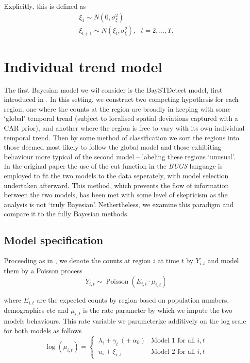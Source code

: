 \documentclass[11pt]{report}
\begin{document}
Explicitly, this is defined as
\begin{gather}
\xi_1 \sim N(0, \sigma_\xi^2) \\
\xi_{t+1} \sim N(\xi_{t}, \sigma_{\xi}^2), \ \ \ t = 2, \ldots, T.
\end{gather}

\chapter{Individual trend model}

The first Bayesian model we wil consider is the BaySTDetect model, first introduced in \citet{baystdetect}. In this setting, we construct two competing hypothesis for each region, one where the counts at the region are broadly in keeping with some `global' temporal trend (subject to localised spatial deviations captured with a CAR prior), and another where the region is free to vary with its own individual temporal trend. Then by some method of classification we sort the regions into those deemed most likely to follow the global model and those exhibiting behaviour more typical of the second model -- labeling these regions `unusual'. \\

In the original paper \citet{baystdetect} the use of the cut function in the \emph{BUGS} language is employed to fit the two models to the data seperately, with model selection undertaken afterward. This method, which prevents the flow of information between the two models, has been met with some level of skepticism \citep{gelmancut} as the analysis is not `truly Bayesian'. Nethertheless, we examine this paradigm and compare it to the fully Bayesian methods. 

\section{Model specification}

Proceeding as in \citet{baystdetect}, we denote the counts at region $i$ at time $t$ by $Y_{i,t}$ and model them by a Poisson process
\begin{equation}
Y_{i,t} \sim \operatorname{Poisson}(E_{i,t} \cdot \mu_{i,t})
\end{equation}

where $E_{i,t}$ are the expected counts by region based on population numbers, demographics etc and $\mu_{i,t}$ is the rate parameter by which we impute the two models behaviours. This rate variable we parameterize additively on the log scale for both models as follows
\begin{equation}
\log{(\mu_{i,t})} = \begin{cases}
\ \lambda_{i} + \gamma_{t} \  (+ \  \alpha_0) & \textrm{Model 1 for all } i, t \\
\ u_{i} + \xi_{i,t} & \textrm{Model 2 for all } i, t
\end{cases}
\end{equation}
\end{document}
